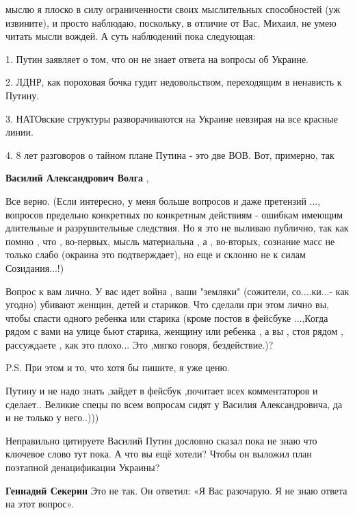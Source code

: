 \begin{itemize}
\begin{itemize}
мыслю я плоско в силу ограниченности своих мыслительных способностей (уж
извините), и просто наблюдаю, поскольку, в отличие от Вас, Михаил, не умею
читать мысли вождей. А суть наблюдений пока следующая: 

1. Путин заявляет о том, что он не знает ответа на вопросы об Украине. 

2. ЛДНР, как пороховая бочка гудит недовольством, переходящим в ненависть к
Путину. 

3. НАТОвские структуры разворачиваются на Украине невзирая на все красные линии. 

4. 8 лет разговоров о тайном плане Путина - это две ВОВ. Вот, примерно, так


\textbf{Василий Александрович Волга} ,

Все верно. (Если интересно, у меня больше вопросов и даже претензий ...,
вопросов предельно конкретных по конкретным действиям - ошибкам имеющим
длительные и разрушительные следствия. Но я это не выливаю публично, так как
помню , что , во-первых, мысль материальна , а , во-вторых, сознание масс не
только слабо (окраина это подтверждает), но еще и склонно не к силам
Созидания...!)

Вопрос к вам лично. У вас идет война , ваши "земляки" (сожители, со....ки...-
как угодно) убивают женщин, детей и стариков. Что сделали при этом лично вы,
чтобы спасти одного ребенка или старика (кроме постов в фейсбуке ...,Когда
рядом с вами на улице бьют старика, женщину или ребенка , а вы , стоя рядом ,
рассуждаете , как это плохо... Это ,мягко говоря, бездействие.)?

P.S. При этом и то, что хотя бы пишите, я уже ценю.

\end{itemize} %


Путину и не надо знать ,зайдет в фейсбук ,почитает всех комментаторов и
сделает.. Великие спецы по всем вопросам сидят у Василия Александровича, да и
не только у него..)))


Неправильно цитируете Василий Путин дословно сказал пока не знаю что ключевое
слово тут пока. А что вы ещё хотели? Чтобы он выложил план поэтапной
денацификации Украины?

\begin{itemize} %
\textbf{Геннадий Секерин} Это не так. Он ответил: «Я Вас разочарую. Я не знаю ответа на этот вопрос».


\end{itemize}
\end{itemize}
